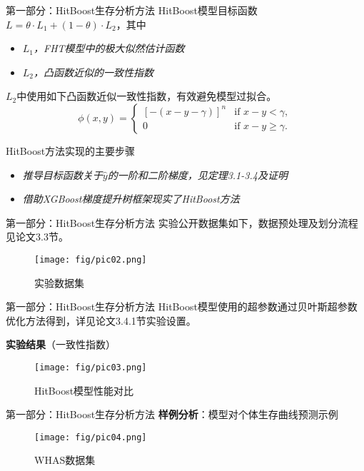 \documentclass[10pt]{beamer}
\begin{document}
\begin{frame}{第一部分：HitBoost生存分析方法}
  HitBoost模型目标函数$L=\theta \cdot L_1 + (1-\theta) \cdot L_2$，其中
  \begin{itemize}
    \item \textit{$L_1$，FHT模型中的极大似然估计函数}
    \item \textit{$L_2$，凸函数近似的一致性指数}
  \end{itemize}

  $L_2$中使用如下凸函数近似一致性指数，有效避免模型过拟合。
  $$\phi(x,y)=
    \begin{cases}
      {[-(x-y-\gamma)]}^n & \text{if } x-y < \gamma,\\
      0 & \text{if } x-y \ge \gamma.
    \end{cases}$$

  HitBoost方法实现的主要步骤
  \begin{itemize}
    \item \textit{推导目标函数关于$\hat{y}$的一阶和二阶梯度，见定理3.1-3.4及证明}
    \item \textit{借助XGBoost梯度提升树框架现实了HitBoost方法}
  \end{itemize}
\end{frame}

\begin{frame}{第一部分：HitBoost生存分析方法}
  实验公开数据集如下，数据预处理及划分流程见论文3.3节。
  \begin{figure}[H]
    \centering
    \texttt{[image: fig/pic02.png]}
    \caption{实验数据集}
  \end{figure}

\end{frame}

\begin{frame}{第一部分：HitBoost生存分析方法}
  HitBoost模型使用的超参数通过贝叶斯超参数优化方法得到，详见论文3.4.1节实验设置。

  \textbf{实验结果}（一致性指数）
  \begin{figure}[H]
    \centering
    \texttt{[image: fig/pic03.png]}
    \caption{HitBoost模型性能对比}
  \end{figure}

\end{frame}

\begin{frame}{第一部分：HitBoost生存分析方法}
  \textbf{样例分析}：模型对个体生存曲线预测示例
  \begin{figure}[H]
    \centering
    \texttt{[image: fig/pic04.png]}
    \caption{WHAS数据集}
  \end{figure}

\end{frame}
\end{document}
